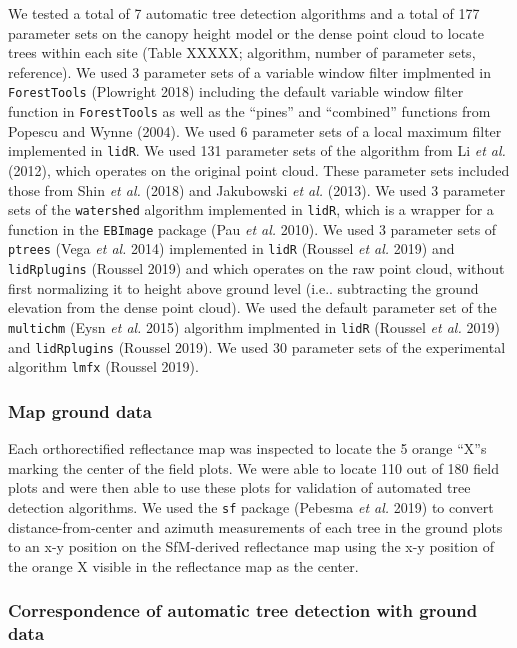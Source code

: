 \documentclass[]{article}
\begin{document}
We tested a total of 7 automatic tree detection algorithms and a total
of 177 parameter sets on the canopy height model or the dense point
cloud to locate trees within each site (Table XXXXX; algorithm, number
of parameter sets, reference). We used 3 parameter sets of a variable
window filter implmented in \texttt{ForestTools} (Plowright 2018)
including the default variable window filter function in
\texttt{ForestTools} as well as the ``pines'' and ``combined'' functions
from Popescu and Wynne (2004). We used 6 parameter sets of a local
maximum filter implemented in \texttt{lidR}. We used 131 parameter sets
of the algorithm from Li \emph{et al.} (2012), which operates on the
original point cloud. These parameter sets included those from Shin
\emph{et al.} (2018) and Jakubowski \emph{et al.} (2013). We used 3
parameter sets of the \texttt{watershed} algorithm implemented in
\texttt{lidR}, which is a wrapper for a function in the \texttt{EBImage}
package (Pau \emph{et al.} 2010). We used 3 parameter sets of
\texttt{ptrees} (Vega \emph{et al.} 2014) implemented in \texttt{lidR}
(Roussel \emph{et al.} 2019) and \texttt{lidRplugins} (Roussel 2019) and
which operates on the raw point cloud, without first normalizing it to
height above ground level (i.e.. subtracting the ground elevation from
the dense point cloud). We used the default parameter set of the
\texttt{multichm} (Eysn \emph{et al.} 2015) algorithm implmented in
\texttt{lidR} (Roussel \emph{et al.} 2019) and \texttt{lidRplugins}
(Roussel 2019). We used 30 parameter sets of the experimental algorithm
\texttt{lmfx} (Roussel 2019).

\subsubsection{Map ground data}\label{map-ground-data}

Each orthorectified reflectance map was inspected to locate the 5 orange
``X''s marking the center of the field plots. We were able to locate 110
out of 180 field plots and were then able to use these plots for
validation of automated tree detection algorithms. We used the
\texttt{sf} package (Pebesma \emph{et al.} 2019) to convert
distance-from-center and azimuth measurements of each tree in the ground
plots to an x-y position on the SfM-derived reflectance map using the
x-y position of the orange X visible in the reflectance map as the
center.

\subsubsection{Correspondence of automatic tree detection with ground
data}\label{correspondence-of-automatic-tree-detection-with-ground-data}
\end{document}
